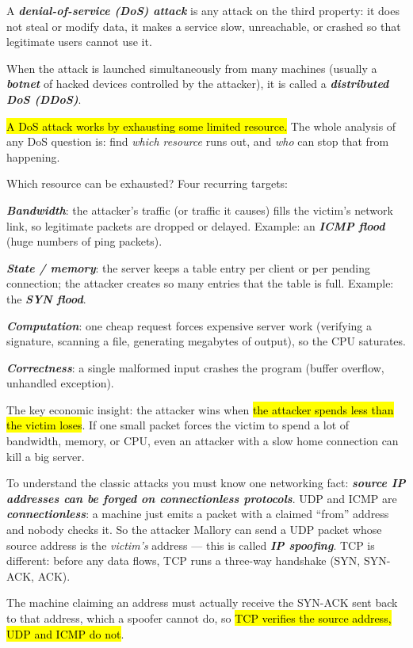 \documentclass[12pt, a4paper]{article}
\newcommand{\term}[1]{\textbf{\textit{#1}}}        %
\newcommand{\imp}[1]{\hl{#1}}                       %
\begin{document}
A \term{denial-of-service (DoS) attack} is any attack on the third property: it does not steal or modify data, it makes a service slow, unreachable, or crashed so that legitimate users cannot use it.

When the attack is launched simultaneously from many machines (usually a \term{botnet} of hacked devices controlled by the attacker), it is called a \term{distributed DoS (DDoS)}.

\imp{A DoS attack works by exhausting some limited resource.} The whole analysis of any DoS question is: find \emph{which resource} runs out, and \emph{who} can stop that from happening.

Which resource can be exhausted? Four recurring targets:
\begin{tightitem}
    \item \term{Bandwidth}: the attacker's traffic (or traffic it causes) fills the victim's network link, so legitimate packets are dropped or delayed. Example: an \term{ICMP flood} (huge numbers of ping packets).
    \item \term{State / memory}: the server keeps a table entry per client or per pending connection; the attacker creates so many entries that the table is full. Example: the \term{SYN flood}.
    \item \term{Computation}: one cheap request forces expensive server work (verifying a signature, scanning a file, generating megabytes of output), so the CPU saturates.
    \item \term{Correctness}: a single malformed input crashes the program (buffer overflow, unhandled exception).
\end{tightitem}
The key economic insight: the attacker wins when \imp{the attacker spends less than the victim loses}. If one small packet forces the victim to spend a lot of bandwidth, memory, or CPU, even an attacker with a slow home connection can kill a big server.

To understand the classic attacks you must know one networking fact: \term{source IP addresses can be forged on connectionless protocols}.
UDP and ICMP are \term{connectionless}: a machine just emits a packet with a claimed ``from'' address and nobody checks it.
So the attacker Mallory can send a UDP packet whose source address is the \emph{victim's} address --- this is called \term{IP spoofing}. TCP is different: before any data flows, TCP runs a three-way handshake (SYN, SYN-ACK, ACK).

The machine claiming an address must actually receive the SYN-ACK sent back to that address, which a spoofer cannot do, so \imp{TCP verifies the source address, UDP and ICMP do not}.
\end{document}
